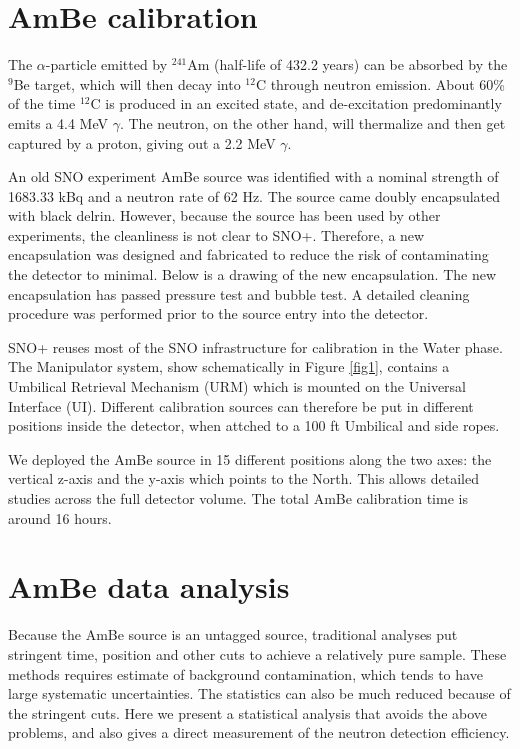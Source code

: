 \documentclass[a4paper]{jpconf}
\begin{document}
\section{AmBe calibration}


The $\alpha$-particle emitted by $^{241}$Am (half-life of 432.2 years) can be absorbed by the $^{9}$Be target, which will then decay into $^{12}$C through neutron emission. About 60\% of the time $^{12}$C is produced in an excited state, and de-excitation predominantly emits a 4.4 MeV $\gamma$. The neutron, on the other hand, will thermalize and then get captured by a proton, giving out a 2.2 MeV $\gamma$.

An old SNO experiment AmBe source was identified with a nominal strength of 1683.33 kBq and a neutron rate of 62 Hz.\cite{} The source came doubly encapsulated with black delrin. However, because the source has been used by other experiments, the cleanliness is not clear to SNO+. Therefore, a new encapsulation was designed and fabricated to reduce the risk of contaminating the detector to minimal. Below is a drawing of the new encapsulation. The new encapsulation has passed pressure test and bubble test. A detailed cleaning procedure was performed prior to the source entry into the detector.

SNO+ reuses most of the SNO infrastructure for calibration in the Water phase.\cite{} The Manipulator system, show schematically in Figure \ref{fig1}, contains a Umbilical Retrieval Mechanism (URM) which is mounted on the Universal Interface (UI). Different calibration sources can therefore be put in different positions inside the detector, when attched to a 100 ft Umbilical and side ropes. 

We deployed the AmBe source in 15 different positions along the two axes: the vertical z-axis and the y-axis which points to the North. This allows detailed studies across the full detector volume. The total AmBe calibration time is around 16 hours.

\section{AmBe data analysis}

Because the AmBe source is an untagged source, traditional analyses put stringent time, position and other cuts to achieve a relatively pure sample. These methods requires estimate of background contamination, which tends to have large systematic uncertainties. The statistics can also be much reduced because of the stringent cuts. Here we present a statistical analysis that avoids the above problems, and also gives a direct measurement of the neutron detection efficiency.
\end{document}

